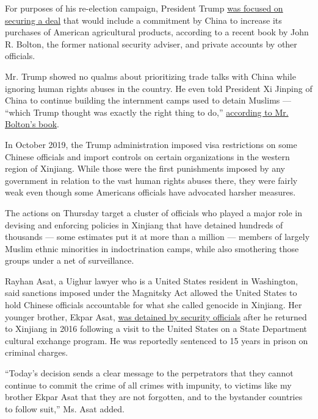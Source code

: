 For purposes of his re-election campaign, President Trump
\href{https://www.nytimes.com/2019/05/04/world/asia/trump-china-uighurs-trade-deal.html}{was
focused on securing a deal} that would include a commitment by China to
increase its purchases of American agricultural products, according to a
recent book by John R. Bolton, the former national security adviser, and
private accounts by other officials.

Mr. Trump showed no qualms about prioritizing trade talks with China
while ignoring human rights abuses in the country. He even told
President Xi Jinping of China to continue building the internment camps
used to detain Muslims --- ``which Trump thought was exactly the right
thing to do,''
\href{https://www.nytimes.com/2020/06/18/us/politics/trump-china-bolton.html}{according
to Mr. Bolton's book}.

In October 2019, the Trump administration imposed visa restrictions on
some Chinese officials and import controls on certain organizations in
the western region of Xinjiang. While those were the first punishments
imposed by any government in relation to the vast human rights abuses
there, they were fairly weak even though some Americans officials have
advocated harsher measures.

The actions on Thursday target a cluster of officials who played a major
role in devising and enforcing policies in Xinjiang that have detained
hundreds of thousands --- some estimates put it at more than a million
--- members of largely Muslim ethnic minorities in indoctrination camps,
while also smothering those groups under a net of surveillance.

Rayhan Asat, a Uighur lawyer who is a United States resident in
Washington, said sanctions imposed under the Magnitsky Act allowed the
United States to hold Chinese officials accountable for what she called
genocide in Xinjiang. Her younger brother, Ekpar Asat,
\href{https://www.nytimes.com/2020/05/09/us/politics/china-uighurs-arrest.html}{was
detained by security officials} after he returned to Xinjiang in 2016
following a visit to the United States on a State Department cultural
exchange program. He was reportedly sentenced to 15 years in prison on
criminal charges.

``Today's decision sends a clear message to the perpetrators that they
cannot continue to commit the crime of all crimes with impunity, to
victims like my brother Ekpar Asat that they are not forgotten, and to
the bystander countries to follow suit,'' Ms. Asat added.

